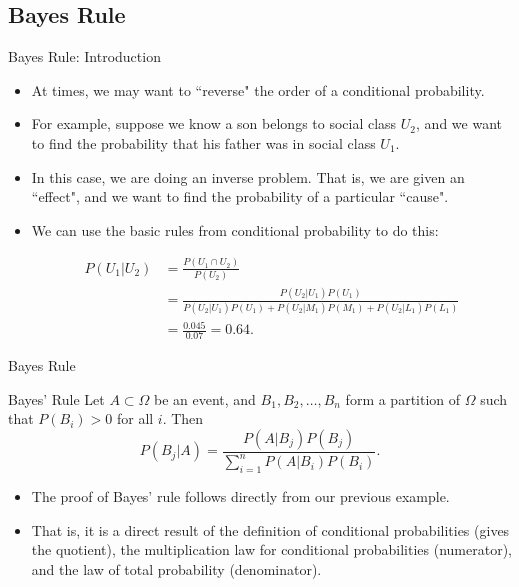 \subsection{Bayes Rule}

\begin{frame}[allowframebreaks]{Bayes Rule: Introduction}
  \begin{itemize}
    \item At times, we may want to ``reverse" the order of a conditional probability.
    \item For example, suppose we know a son belongs to social class $U_2$, and we want to find the probability that his father was in social class $U_1$.
  
    \item In this case, we are doing an \alert{inverse} problem. That is, we are given an ``effect", and we want to find the probability of a particular ``cause".
    
    \item We can use the basic rules from conditional probability to do this:
  
  \begin{align*}
    P(U_1 | U_2) &= \frac{P(U_1 \cap U_2)}{P(U_2)} \\
    &= \frac{P(U_2 | U_1)P(U_1)}{P(U_2 | U_1)P(U_1) + P(U_2 | M_1)P(M_1) + P(U_2|L_1)P(L_1)}\\
    &= \frac{0.045}{0.07} = 0.64.
  \end{align*}
  \end{itemize}
  
\end{frame}

\begin{frame}{Bayes Rule}

  \begin{block}{Bayes' Rule}
    Let $A \subset \Omega$ be an event, and $B_1, B_2, \ldots, B_n$ form a partition of $\Omega$ such that $P(B_i) > 0$ for all $i$. Then
    $$
    P(B_j | A) = \frac{P(A | B_j)P(B_j)}{\sum_{i = 1}^n P(A|B_i)P(B_i)}.
    $$
  \end{block}

  \begin{itemize}
    \item The proof of Bayes' rule follows directly from our previous example.

    \item That is, it is a direct result of the definition of conditional probabilities (gives the quotient), the multiplication law for conditional probabilities (numerator), and the law of total probability (denominator).
  \end{itemize}

\end{frame}
  
